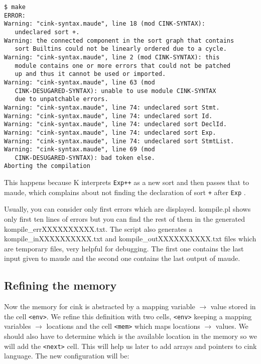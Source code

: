 \documentclass[11pt,a4paper]{article}
\begin{document}
\begin{verbatim}
$ make
ERROR:
Warning: "cink-syntax.maude", line 18 (mod CINK-SYNTAX):
   undeclared sort +.
Warning: the connected component in the sort graph that contains
   sort Builtins could not be linearly ordered due to a cycle.
Warning: "cink-syntax.maude", line 2 (mod CINK-SYNTAX): this
   module contains one or more errors that could not be patched
   up and thus it cannot be used or imported.
Warning: "cink-syntax.maude", line 63 (mod 
   CINK-DESUGARED-SYNTAX): unable to use module CINK-SYNTAX
   due to unpatchable errors.
Warning: "cink-syntax.maude", line 74: undeclared sort Stmt.
Warning: "cink-syntax.maude", line 74: undeclared sort Id.
Warning: "cink-syntax.maude", line 74: undeclared sort DeclId.
Warning: "cink-syntax.maude", line 74: undeclared sort Exp.
Warning: "cink-syntax.maude", line 74: undeclared sort StmtList.
Warning: "cink-syntax.maude", line 69 (mod
   CINK-DESUGARED-SYNTAX): bad token else.
Aborting the compilation
\end{verbatim}

This happens because K interprets \texttt{Exp++} as a new sort and then passes that to maude, which complains about not finding the declaration of sort \verb^+^ after \verb^Exp^ .

Usually, you can consider only first errors which are displayed. kompile.pl shows only first ten lines of errors but you can find the rest of them in the generated kompile\_errXXXXXXXXXX.txt. The script also generates a kompile\_inXXXXXXXXXX.txt and kompile\_outXXXXXXXXXX.txt files which are  temporary files, very helpful for debugging. The first one contains the last input given to maude and the second one contains the last output of maude.

\subsection{Refining the memory}

Now the memory for cink is abstracted by a mapping variable $\to$ value stored in the cell \verb+<env>+. We refine this definition with two cells, \verb+<env>+ keeping a mapping variables $\to$ locations and the cell \verb+<mem>+ which maps locations $\to$ values. We should also have to determine which is the available location in the memory so we will add the \verb^<next>^ cell. This will help us later to add arrays and pointers to cink language. The new configuration will be:
\end{document}
